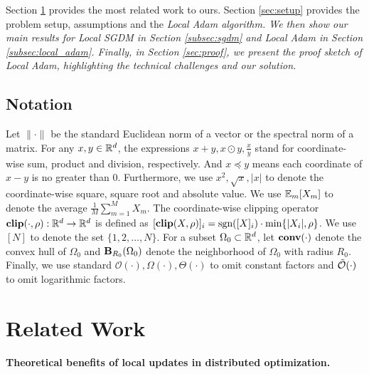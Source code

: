 \documentclass{article} %
\numberwithin{equation}{section}
\begin{document}
Section \ref{sec:related_work} provides the most related work to ours. 
Section \ref{sec:setup} provides the problem setup, assumptions and the \em Local \em Adam algorithm.
We then show our main results for \em Local \em SGDM in Section \ref{subsec:sgdm} and \em Local \em Adam in Section \ref{subsec:local_adam}.
Finally, in Section \ref{sec:proof}, we present the proof sketch of \em Local \em Adam, highlighting the technical challenges and our solution.

\subsection{Notation}
Let $\|\cdot\|$ be the standard Euclidean norm of a vector or the spectral norm of a matrix. 
For any $x,y\in\mathbb{R}^d$, the expressions $x+y, x\odot y, \frac{x}{y}$ stand for coordinate-wise sum, product and division, respectively. 
And $x\preceq y$ means each coordinate of $x-y$ is no greater than $0$.
Furthermore, we use $x^2, \sqrt{x}, |x|$ to denote the coordinate-wise square, square root and absolute value. 
We use $\mathbb{E}_m[X_m]$ to denote the average $\frac{1}{M}\sum_{m=1}^M X_m$. The coordinate-wise clipping operator $\textbf{clip}(\cdot,\rho):\mathbb{R}^d\to\mathbb{R}^d$ is defined as $[\textbf{clip}(X,\rho)]_i = \text{sgn}([X]_i)\cdot\min\{|X_i|, \rho\}$. We use $[N]$ to denote the set $\{1, 2, \ldots, N\}$. For a subset $\Omega_0\subset \mathbb{R}^d$, let $\mbox{\bf conv}(\cdot)$ denote the convex hull of $\Omega_0$ and $\mbox{\bf B}_{R_0}(\Omega_0)$ denote the neighborhood of $\Omega_0$ with radius $R_0$. Finally, we use standard $\mathcal{O}(\cdot), \Omega(\cdot), \Theta(\cdot)$ to omit constant factors and $\Tilde{\mathcal{O}}(\cdot)$ to omit logarithmic factors. 



\section{Related Work}\label{sec:related_work}


\paragraph{Theoretical benefits of local updates in distributed optimization.}
\end{document}
